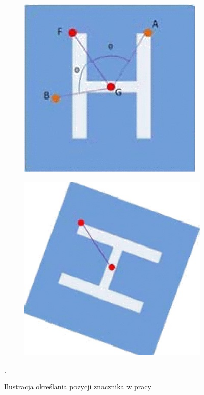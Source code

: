 \begin{figure}
	\centering
	\begin{subfigure}{0.4\textwidth}
		\centering
		\includegraphics[width=\textwidth]{pozycja_H_a.jpg}
		\caption{}
		\label{fig:pozycja_H_a}
	\end{subfigure}
	\begin{subfigure}{0.4\textwidth}
		\centering
		\includegraphics[width=\textwidth]{pozycja_H_b.jpg}
		\caption{}
		\label{fig:pozycja_H_b}
	\end{subfigure}%
	\caption{Ilustracja określania pozycji znacznika w pracy \cite{H} }.
	\label{fig:Znacznik_H_pozycja}
\end{figure}


